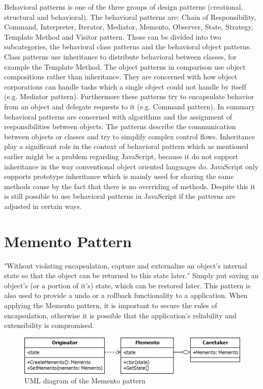 \documentclass{bioinfo}
\begin{document}
Behavioral patterns is one of the three groups of design patterns (creational, structural and behavioral). The behavioral patterns are: Chain of Responsibility, Command, Interpreter, Iterator, Mediator, Memento, Observer, State, Strategy, Template Method and Visitor pattern. Those can be divided into two subcategories, the behavioral class patterns and the behavioral object patterns. Class patterns use inheritance to distribute behavioral between classes, for example the Template Method. The object patterns in comparison use object compositions rather than inheritance.  They are concerned with how object corporations can handle tasks which a single object could not handle by itself (e.g. Mediator pattern). Furthermore these patterns try to encapsulate behavior from an object and delegate requests to it (e.g. Command pattern). \cite{gang4}
In summary behavioral patterns are concerned with algorithms and the assignment of responsibilities between objects. The patterns describe the communication between objects or classes and try to simplify complex control flows.
Inheritance play a significant role in the context of behavioral pattern which as mentioned earlier might be a problem regarding JavaScript, because it do not support inheritance in the way conventional object oriented languages do. JavaScript only supports prototype inheritance which is mainly used for sharing the same methods cause by the fact that there is no overriding of methods.
Despite this it is still possible to use behavioral patterns in JavaScript if the patterns are adjusted in certain ways.

\section{Memento Pattern}
"Without violating encapsulation, capture and externalize an object's internal state so that the object can be returned to this state later." \cite{sourcem} Simply put saving an object's (or a portion of it's) state, which can be restored later. This pattern is also used to provide a undo or a rollback functionality to a application. When applying the Memento pattern, it  is important to secure the rules of encapsulation, otherwise it is possible that the application's reliability and extensibility is compromised. \cite{gang4} 
\begin{figure}[ht]
    \centering
    \includegraphics[width=1\linewidth]{img/Memento.png}
    \caption{UML diagram of the Memento pattern \cite{mementoUML}}
    \label{fig:Memento_pattern}
\end{figure}
\end{document}
